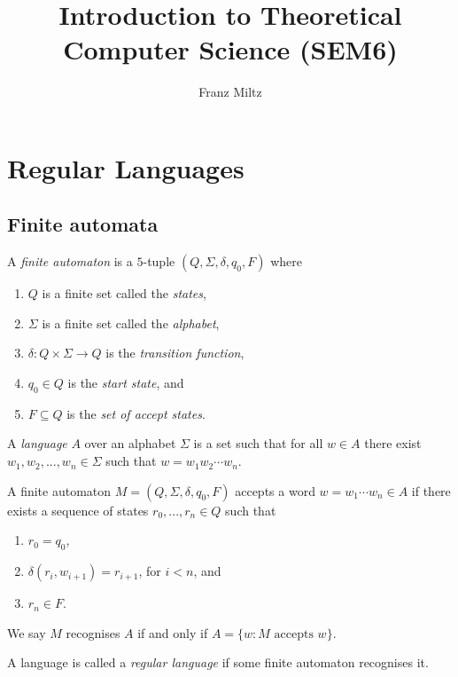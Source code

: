 \documentclass{article}
\title{Introduction to Theoretical Computer Science (SEM6)}
\author{Franz Miltz}
\begin{document}
\maketitle
\tableofcontents
\pagebreak

\section{Regular Languages}

\subsection{Finite automata}

\begin{definition}[Sipser, p. 35]
    A \emph{finite automaton} is a $5$-tuple $(Q,\Sigma,\delta,q_0,F)$ where 
    \begin{enumerate}
        \item $Q$ is a finite set called the \emph{states},
        \item $\Sigma$ is a finite set called the \emph{alphabet},
        \item $\delta:Q\times\Sigma\to Q$ is the \emph{transition function},
        \item $q_0\in Q$ is the \emph{start state}, and 
        \item $F\subseteq Q$ is the \emph{set of accept states}.
    \end{enumerate} 
\end{definition}

\begin{definition}
    A \emph{language} $A$ over an alphabet $\Sigma$ is a set such that for all 
    $w\in A$ there exist $w_1,w_2,...,w_n\in\Sigma$ such that $w=w_1w_2\cdots w_n$.
    
    A finite automaton $M=(Q,\Sigma,\delta,q_0,F)$ accepts a word $w=w_1\cdots w_n\in A$ 
    if there exists a sequence of states $r_0,...,r_n\in Q$ such that 
    \begin{enumerate}
        \item $r_0=q_0$,
        \item $\delta(r_i,w_{i+1})=r_{i+1}$, for $i<n$, and 
        \item $r_n\in F$.
    \end{enumerate}
    We say $M$ recognises $A$ if and only if $A=\{w : M\text{ accepts }w\}$.
\end{definition}

\begin{definition}[Sipser p. 40]
    A language is called a \emph{regular language} if some finite automaton recognises it.
\end{definition}
\end{document}
